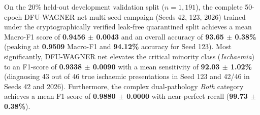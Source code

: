 \documentclass[journal]{IEEEtran}
\begin{document}
On the 20\% held-out development validation split ($n = 1,191$), the complete 50-epoch DFU-WAGNER net multi-seed campaign (Seeds 42, 123, 2026) trained under the cryptographically verified leak-free quarantined split achieves a mean Macro-F1 score of \textbf{0.9456 $\pm$ 0.0043} and an overall accuracy of \textbf{93.65 $\pm$ 0.38\%} (peaking at \textbf{0.9509} Macro-F1 and \textbf{94.12\%} accuracy for Seed 123). Most significantly, DFU-WAGNER net elevates the critical minority class (\textit{Ischaemia}) to an F1-score of \textbf{0.9338 $\pm$ 0.0090} with a mean sensitivity of \textbf{92.03 $\pm$ 1.02\%} (diagnosing 43 out of 46 true ischaemic presentations in Seed 123 and 42/46 in Seeds 42 and 2026). Furthermore, the complex dual-pathology \textit{Both} category achieves a mean F1-score of \textbf{0.9880 $\pm$ 0.0000} with near-perfect recall (\textbf{99.73 $\pm$ 0.38\%}).
\end{document}

